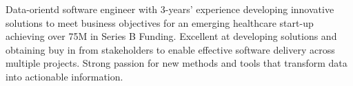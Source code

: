 

\begin{cvparagraph}

Data-orientd software engineer with 3-years’ experience developing innovative solutions to meet business objectives for an emerging healthcare start-up achieving over 75M in Series B Funding. Excellent at developing solutions and obtaining buy in from stakeholders to enable effective software delivery across multiple projects. Strong passion for new methods and tools that transform data into actionable information.
\end{cvparagraph}
